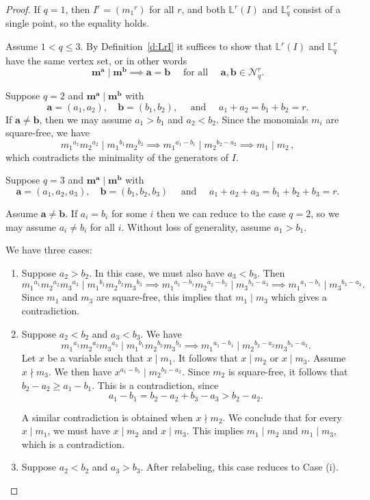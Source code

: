 \documentclass[11pt]{article}
\theoremstyle{definition}
\numberwithin{equation}{section}
\newcommand{\Nrq}{\mathcal{N}^r_q}
\newcommand{\Lrq}{\mathbb{L}^r_q}
\newcommand{\Lr}{\mathbb{L}^r}
\newcommand{\ba}{\mathbf{a}}
\newcommand{\bb}{\mathbf{b}}
\newcommand{\bma}{\mathbf{m}^\ba}
\newcommand{\bmb}{\mathbf{m}^\bb}
\newcommand{\qand}{\quad \mbox{ and } \quad }
\newcommand{\qforall}{\quad \mbox{ for all } \quad }
\begin{document}
\begin{proof} If $q=1$, then $I^r=({m_1}^r)$ for all $r$, and both
  $\Lr(I)$ and $\Lrq$ consist of a single point, so the equality holds.

 Assume $1< q \le 3$. By Definition~\ref{d:LrI} it suffices to show that
 $\Lr(I)$ and $\Lrq$ have the same vertex set, or in other
 words
   $$\bma \mid \bmb \implies  \ba=\bb \qforall \ba,\bb\in \Nrq.$$
 
  Suppose $q=2$ and $\bma \mid \bmb$ with
 $$\ba = (a_1,a_2), \quad \bb=(b_1,b_2), \qand a_1+a_2=b_1+b_2=r.$$ If
  $\ba\ne \bb$, then we may assume $a_1>b_1$ and $a_2<b_2$.  Since the
  monomials $m_i$ are square-free, we have
 $${m_1}^{a_1}{m_2}^{a_2} \mid {m_1}^{b_1}{m_2}^{b_2}\implies {m_1}^{a_1-b_1}
 \mid {m_2}^{b_2-a_2}\implies m_1\mid m_2\,,$$
which  contradicts the
 minimality of the generators of $I$.
 
Suppose $q=3$ and $\bma \mid \bmb$ with $$\ba
=(a_1,a_2,a_3),\quad \bb = (b_1,b_2,b_3) \qand
a_1+a_2+a_3=b_1+b_2+b_3=r.$$ 

Assume $\ba\ne \bb$.  If $a_i=b_i$ for some $i$ then we can reduce to
the case $q=2$, so we may assume $a_i\ne b_i$ for all $i$. Without
loss of generality, assume $a_1>b_1$.

We have three cases:

  \begin{enumerate}[label=\textup{(}\roman*\textup{)}]
 \item Suppose $a_2 >b_2$. In this case, we must also have
   $a_3<b_3$. Then {\small $$ {m_1}^{a_1}{m_2}^{a_2}{m_3}^{a_3} \mid
   {m_1}^{b_1}{m_2}^{b_2}{m_3}^{b_3}\implies {m_1}^{a_1-b_1}{m_2}^{a_2-b_2} \mid
   {m_3}^{b_3-a_3}\implies {m_1}^{a_1-b_1} \mid {m_3}^{b_3-a_3}.$$} Since
   $m_1$ and $m_3$ are square-free, this implies that $m_1\mid m_3$
   which gives a
   contradiction. 

\item Suppose $a_2 < b_2$ and
  $a_3 < b_3$.  We have  
   $${m_1}^{a_1}{m_2}^{a_2}{m_3}^{a_3} \mid
  {m_1}^{b_1}{m_2}^{b_2}{m_3}^{b_3}\implies {m_1}^{a_1-b_1} \mid
  {m_2}^{b_2-a_2}{m_3}^{b_3-a_3}.$$ Let $x$ be a variable such that $x
  \mid m_1$. It follows that $x\mid m_2$ or $x\mid m_3$. Assume
  $x\nmid m_3$.  We then have $x^{a_1-b_1}\mid {m_2}^{b_2-a_2}$. Since
  $m_2$ is square-free, it follows that $b_2-a_2\ge
  a_1-b_1$. This is a contradiction, since
$$a_1-b_1=b_2-a_2+b_3-a_3>b_2-a_2.$$

 A similar contradiction is obtained when $x\nmid m_2$. We conclude
 that for every $x \mid m_1$, we must have $x\mid m_2$ and $x\mid
 m_3$. This implies $m_1 \mid m_2$ and $m_1\mid m_3$,
 which is a contradiction.
 
\item Suppose $a_2<b_2$ and $a_3>b_3$. After relabeling, this case reduces
  to Case (i).
\end{enumerate}
\end{proof}
\end{document}
